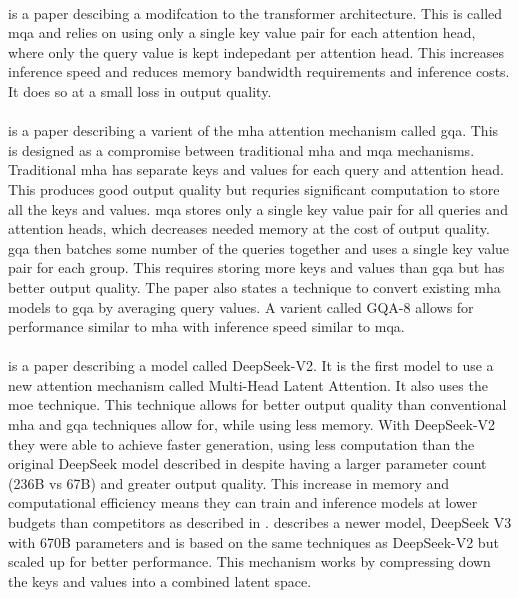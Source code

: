 \paragraph{}\cite{shazeer_fast_2019} is a paper descibing a modifcation to the transformer architecture. This is called \acrfull{mqa} and relies on using only a single key value pair for each attention head, where only the query value is kept indepedant per attention head. This increases inference speed and reduces memory bandwidth requirements and inference costs. It does so at a small loss in output quality.

\paragraph{}\cite{ainslie_gqa_2023} is a paper describing a varient of the \acrshort{mha} attention mechanism called \acrfull{gqa}. This is designed as a compromise between traditional \acrshort{mha} and \acrshort{mqa} mechanisms. Traditional \acrlong{mha} has separate keys and values for each query and attention head. This produces good output quality but requries significant computation to store all the keys and values. \acrshort{mqa} stores only a single key value pair for all queries and attention heads, which decreases needed memory at the cost of output quality. \acrshort{gqa} then batches some number of the queries together and uses a single key value pair for each group. This requires storing more keys and values than \acrshort{gqa} but has better output quality. The paper also states a technique to convert existing \acrshort{mha} models to \acrshort{gqa} by averaging query values. A varient called GQA-8 allows for performance similar to \acrshort{mha} with inference speed similar to \acrshort{mqa}.

\paragraph{}\cite{deepseek-ai_deepseek-v2_2024} is a paper describing a model called DeepSeek-V2. It is the first model to use a new attention mechanism called Multi-Head Latent Attention. It also uses the \acrfull{moe} technique. This technique allows for better output quality than conventional \acrlong{mha} and \acrlong{gqa} techniques allow for, while using less memory. With DeepSeek-V2 they were able to achieve faster generation, using less computation than the original DeepSeek model described in \cite{deepseek-ai_deepseek_2024} despite having a larger parameter count (236B vs 67B) and greater output quality. This increase in memory and computational efficiency means they can train and inference models at lower budgets than competitors as described in \cite{deepseek-ai_deepseek-v3_2025}. \cite{deepseek-ai_deepseek-v3_2025} describes a newer model, DeepSeek V3 with 670B parameters and is based on the same techniques as DeepSeek-V2 but scaled up for better performance. This mechanism works by compressing down the keys and values into a combined latent space.

